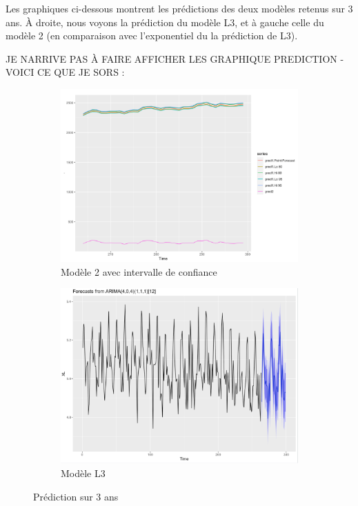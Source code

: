 \documentclass[12pt,a4paper]{book}
\newcommand{\1}{\mathds{1}}
\begin{document}
Les graphiques ci-dessous montrent les prédictions des deux modèles retenus sur 3 ans. À droite, nous voyons la prédiction du modèle L3, et à gauche celle du modèle 2 (en comparaison avec l'exponentiel du la prédiction de L3).

JE NARRIVE PAS À FAIRE AFFICHER LES GRAPHIQUE PREDICTION - VOICI CE QUE JE SORS : 


\begin{figure}[h]
	\begin{subfigure}{.5\textwidth}
  		\centering
    	\includegraphics[scale=0.4]{Pred1}  
    	\caption{Modèle 2 avec intervalle de confiance}
    	\label{fig:sub1}
    \end{subfigure}
    \begin{subfigure}{.5\textwidth}
    	\centering
    	\includegraphics[scale=0.4]{PredL2}  
    	\caption{Modèle L3}
    	\label{fig:sub2}
    \end{subfigure}

\caption{Prédiction sur 3 ans}
\label{fig:1}
   
\end{figure}
\end{document}
